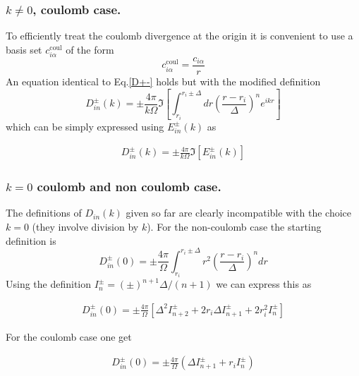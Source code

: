\subsubsection{$k\ne 0$, coulomb case.}
To efficiently treat the coulomb divergence at the origin it is convenient to use
a basis set $c_{i\alpha}^\text{coul}$ of the form 
\begin{equation}
c_{i\alpha}^\text{coul}=\frac{c_{i\alpha}}{r}
\end{equation}
An equation identical to Eq.\ref{D+-} holds but with the modified definition
\begin{equation}
D_{in}^\pm(k)=\pm\frac{4\pi}{k\Omega}\Im\left[\int_{r_i}^{r_i\pm\Delta}
dr\left(\frac{r-r_i}{\Delta}\right)^n e^{ikr}\right]
\end{equation}
which can be simply expressed using $E^\pm_{in}(k)$ as
\vskip 3mm
\begin{center}
\begin{eqnarray}
D_{in}^\pm(k)=\pm\frac{4\pi}{k\Omega}\Im\left[E_{in}^\pm(k)\right]
\label{coulD+-}
\end{eqnarray}
\end{center}
\vskip 3mm
\subsubsection{$k=0$ coulomb and non coulomb case.}
The definitions of $D_{in}(k)$ given so far are clearly incompatible 
with the choice $k=0$ (they involve division by $k$). For the non-coulomb
case the starting definition is
\begin{equation}
D^\pm_{in}(0)=\pm\frac{4\pi}{\Omega}\int_{r_i}^{r_i\pm\Delta}r^2
\left(\frac{r-r_i}{\Delta}\right)^ndr
\end{equation}
Using the definition $I_n^\pm=(\pm)^{n+1}\Delta/(n+1)$ we can express this
as
\begin{center}
\vskip 3mm
\begin{eqnarray}
D^\pm_{in}(0)=\pm\frac{4\pi}{\Omega}\left[\Delta^2 I_{n+2}^\pm
+2r_i\Delta I_{n+1}^\pm+2r_i^2I_n^\pm\right]
\label{noncoul_k=0D+-}
\end{eqnarray}
\end{center}
\vskip 3mm
For the coulomb case one get

\vskip 3mm
\begin{center}
\begin{eqnarray}
D^\pm_{in}(0)=\pm\frac{4\pi}{\Omega}\left(
\Delta I^\pm_{n+1} + r_i I^\pm_n\right)
\label{coul_k=0D+-}
\end{eqnarray}
\end{center}
\vskip 3mm
